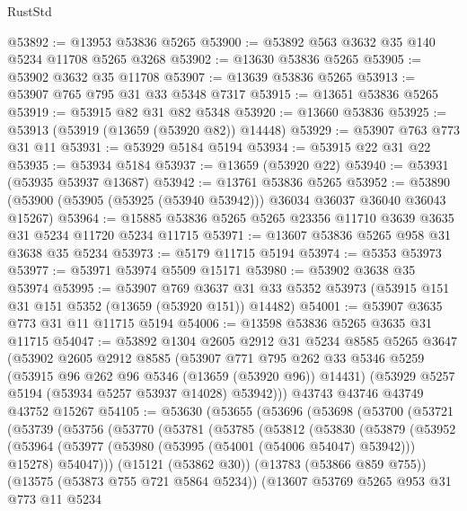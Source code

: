 \begin{lexlean}{RustStd}
\begin{coremodule}
@53892 := @13953 @53836 @5265
@53900 := @53892 @563 @3632 @35 @140 @5234 @11708 @5265 @3268
@53902 := @13630 @53836 @5265
@53905 := @53902 @3632 @35 @11708
@53907 := @13639 @53836 @5265
@53913 := @53907 @765 @795 @31 @33 @5348 @7317
@53915 := @13651 @53836 @5265
@53919 := @53915 @82 @31 @82 @5348
@53920 := @13660 @53836
@53925 := @53913 (@53919 (@13659 (@53920 @82)) @14448)
@53929 := @53907 @763 @773 @31 @11
@53931 := @53929 @5184 @5194
@53934 := @53915 @22 @31 @22
@53935 := @53934 @5184
@53937 := @13659 (@53920 @22)
@53940 := @53931 (@53935 @53937 @13687)
@53942 := @13761 @53836 @5265
@53952 := @53890 (@53900 (@53905 (@53925 (@53940 @53942))) @36034 @36037 @36040 @36043 @15267)
@53964 := @15885 @53836 @5265 @5265 @23356 @11710 @3639 @3635 @31 @5234 @11720 @5234 @11715
@53971 := @13607 @53836 @5265 @958 @31 @3638 @35 @5234
@53973 := @5179 @11715 @5194
@53974 := @5353 @53973
@53977 := @53971 @53974 @5509 @15171
@53980 := @53902 @3638 @35 @53974
@53995 := @53907
    @769
    @3637
    @31
    @33
    @5352
    @53973
    (@53915 @151 @31 @151 @5352 (@13659 (@53920 @151)) @14482)
@54001 := @53907 @3635 @773 @31 @11 @11715 @5194
@54006 := @13598 @53836 @5265 @3635 @31 @11715
@54047 := @53892
    @1304
    @2605
    @2912
    @31
    @5234
    @8585
    @5265
    @3647
    (@53902
      @2605
      @2912
      @8585
      (@53907
        @771
        @795
        @262
        @33
        @5346
        @5259
        (@53915 @96 @262 @96 @5346 (@13659 (@53920 @96)) @14431)
        (@53929 @5257 @5194 (@53934 @5257 @53937 @14028) @53942)))
    @43743
    @43746
    @43749
    @43752
    @15267
@54105 := @53630
    (@53655
      (@53696
        (@53698
          (@53700
            (@53721
              (@53739
                (@53756
                  (@53770
                    (@53781
                      (@53785
                        (@53812
                          (@53830
                            (@53879
                              (@53952
                                (@53964
                                  (@53977 (@53980 (@53995 (@54001 (@54006 @54047) @53942))) @15278)
                                  @54047)))
                            (@15121 (@53862 @30))
                            (@13783 (@53866 @859 @755))
                            (@13575 (@53873 @755 @721 @5864 @5234))
                            (@13607
                              @53769
                              @5265
                              @953
                              @31
                              @773
                              @11
                              @5234

\end{coremodule}
\end{lexlean}
